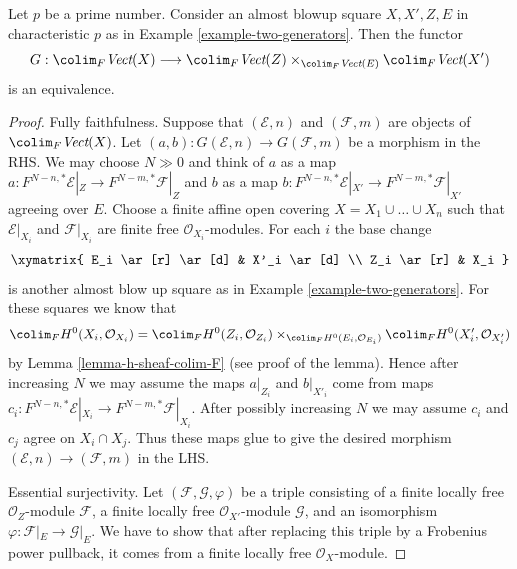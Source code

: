 %
\begin{lemma}
\label{lemma-vector-bundle-II}
Let $p$ be a prime number. Consider an almost blowup square $X, X', Z, E$
in characteristic $p$ as in Example \ref{example-two-generators}.
Then the functor
$$
G :
\colim_F \textit{Vect}(X)
\longrightarrow
\colim_F \textit{Vect}(Z)
\times_{\colim_F \textit{Vect}(E)}
\colim_F \textit{Vect}(X')
$$
is an equivalence.
\end{lemma}

\begin{proof}
Fully faithfulness. Suppose that $(\mathcal{E}, n)$ and
$(\mathcal{F}, m)$ are objects of $\colim_F \textit{Vect}(X)$.
Let $(a, b) : G(\mathcal{E}, n) \to G(\mathcal{F}, m)$
be a morphism in the RHS. We may choose $N \gg 0$ and
think of $a$ as a map
$a : F^{N - n, *}\mathcal{E}|_Z \to F^{N - m, *}\mathcal{F}|_Z$
and $b$ as a map
$b : F^{N - n, *}\mathcal{E}|_{X'} \to F^{N - m, *}\mathcal{F}|_{X'}$
agreeing over $E$.
Choose a finite affine open covering
$X = X_1 \cup \ldots \cup X_n$ such that $\mathcal{E}|_{X_i}$
and $\mathcal{F}|_{X_i}$ are finite free $\mathcal{O}_{X_i}$-modules.
For each $i$ the base change
$$
\xymatrix{
E_i \ar[r] \ar[d] & X'_i \ar[d] \\
Z_i \ar[r] & X_i
}
$$
is another almost blow up square as in Example \ref{example-two-generators}.
For these squares we know that
$$
\colim_F H^0(X_i, \mathcal{O}_{X_i}) =
\colim_F H^0(Z_i, \mathcal{O}_{Z_i})
\times_{\colim_F H^0(E_i, \mathcal{O}_{E_i})}
\colim_F H^0(X'_i, \mathcal{O}_{X'_i})
$$
by Lemma \ref{lemma-h-sheaf-colim-F} (see proof of the lemma).
Hence after increasing $N$ we may assume
the maps $a|_{Z_i}$ and $b|_{X'_i}$ come from
maps $c_i : F^{N - n, *}\mathcal{E}|_{X_i} \to F^{N - m, *}\mathcal{F}|_{X_i}$.
After possibly increasing $N$ we may assume $c_i$ and $c_j$
agree on $X_i \cap X_j$. Thus these maps glue to give the
desired morphism $(\mathcal{E}, n) \to (\mathcal{F}, m)$
in the LHS.

\medskip\noindent
Essential surjectivity. Let $(\mathcal{F}, \mathcal{G}, \varphi)$ be a
triple consisting of
a finite locally free $\mathcal{O}_Z$-module $\mathcal{F}$,
a finite locally free $\mathcal{O}_{X'}$-module $\mathcal{G}$, and
an isomorphism $\varphi : \mathcal{F}|_E \to \mathcal{G}|_E$.
We have to show that after replacing this triple by a Frobenius
power pullback, it comes from a finite locally free $\mathcal{O}_X$-module.


\end{proof}

